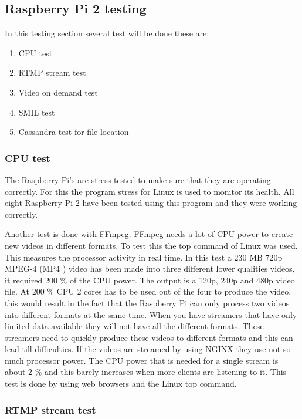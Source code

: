 \documentclass{sig-alternate-br}
\begin{document}
\subsection{Raspberry Pi 2  testing}

In this testing section several test will be done these are: 
\begin{enumerate}[topsep=0pt,itemsep=-1ex,partopsep=1ex,parsep=1ex] 
	\item CPU test
	\item RTMP stream test
	\item Video on demand test
	\item SMIL test
	\item Cassandra test for file location
\end{enumerate}

\subsubsection{CPU test}

The Raspberry Pi's are stress tested to make sure that they are operating correctly. For this the program stress for Linux is used to monitor its health. All eight Raspberry Pi 2 have been tested using this program and they were working correctly. 

Another test is done with FFmpeg. FFmpeg needs a lot of CPU power to create new videos in different formats. To test this the top command of Linux was used. This measures the processor activity in real time. In this test a 230 MB 720p MPEG-4 (MP4 ) video has been made into three different lower qualities videos, it required 200 \% of the CPU power. The output is a 120p, 240p and 480p video file. At 200 \% CPU 2 cores has to be used out of the four to produce the video, this would result in the fact that the Raspberry Pi can only process two videos into different formats at the same time. When you have streamers that have only limited data available they will not have all the different formats. These streamers need to quickly produce these videos to different formats and this can lead till difficulties.  \newline
If the videos are streamed by using NGINX they use not so much processor power. The CPU power that is needed for a single stream is about 2 \% and this barely increases when more clients are listening to it. This test is done by using web browsers and the Linux top command. 

\subsubsection{RTMP stream test}
\end{document}
